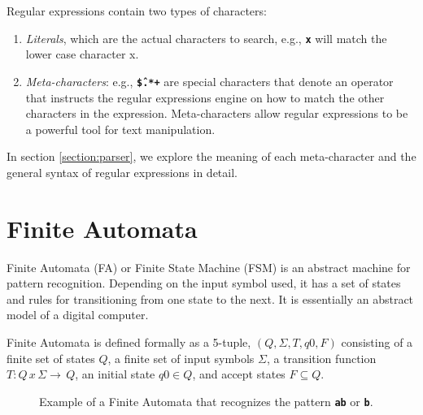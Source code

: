 Regular expressions contain two types of characters:
\begin{enumerate}
    \item \textit{Literals}, which are the actual characters to search, e.g., \texttt{\textbf{x}} will match the lower case character x.
    \item \textit{Meta-characters}: e.g., \texttt{\textbf{\^\$.*+}} are special characters that denote an operator that instructs the regular expressions engine on how to match the other characters in the expression. Meta-characters allow regular expressions to be a powerful tool for text manipulation.
\end{enumerate}

In section \ref{section:parser}, we explore the meaning of each meta-character and the general syntax of regular expressions in detail.

\section{Finite Automata}

Finite Automata (FA) or Finite State Machine (FSM) is an abstract machine for pattern recognition. Depending on the input symbol used, it has a set of states and rules for transitioning from one state to the next. It is essentially an abstract model of a digital computer. 

Finite Automata is defined formally as a 5-tuple, $(Q, Σ, T, q0, F)$ consisting of a finite set of states $Q$, a finite set of input symbols $\Sigma$, a transition function $T: Q \, x \, Σ → \, Q$, an initial state $q0 ∈ Q$, and accept states $F \subseteq Q$.

\begin{figure}[H]
\centering
{}
\caption{Example of a Finite Automata that recognizes the pattern \texttt{\textbf{ab}} or \texttt{\textbf{b}}.}
\label{fig:fsm}
\end{figure}

